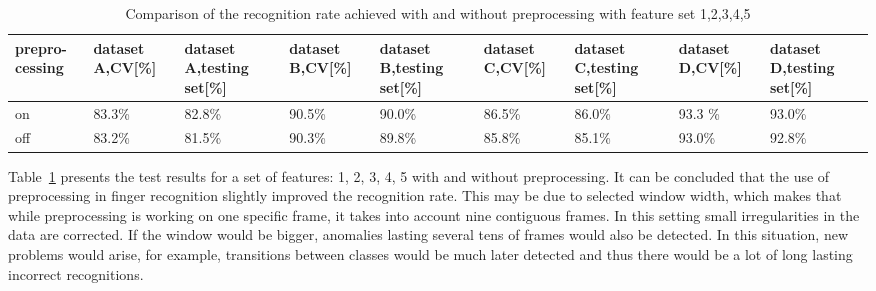 \begin{table}[htp!]
\begin{center}
	\label{findiffpre}
	\caption{Comparison of the recognition rate achieved with and without preprocessing with feature set 1,2,3,4,5}
    \begin{tabular}{p{1.1cm}p{1.1cm}p{1.1cm}p{1.1cm}p{1.1cm}p{1.1cm}p{1.1cm}p{1.1cm}p{1.1cm}}
    \hline
    prepro-cessing & dataset A,\linebreak CV[\%] & dataset A,\linebreak testing set[\%] & dataset B,\linebreak CV[\%] & dataset B,\linebreak testing set[\%] & dataset C,\linebreak CV[\%]& dataset C,\linebreak testing set[\%]  & dataset D,\linebreak CV[\%] & dataset D,\linebreak testing set[\%]  \\ \hline \hline
    on        & 83.3\% & 82.8\%  & 90.5\% & 90.0\% & 86.5\% & 86.0\% & 93.3 \% & 93.0\% \\ \hline
    off   	  & 83.2\% & 81.5\% & 90.3\%  & 89.8\% & 85.8\% & 85.1\% & 93.0\% & 92.8\% \\ \hline
    \end{tabular}
    \end{center}
\end{table}

Table~\ref{findiffpre} presents the test results for a set of features: 1, 2, 3, 4, 5 with and without preprocessing. It can be concluded that the use of preprocessing in finger recognition slightly improved the recognition rate. This may be due to selected window width, which makes that while preprocessing is working on one specific frame, it takes into account nine contiguous frames. In this setting small irregularities in the data are corrected. If the window would be bigger, anomalies lasting several tens of frames would also be detected. In this situation, new problems would arise, for example, transitions between classes would be much later detected and thus there would be a lot of long lasting incorrect recognitions.




